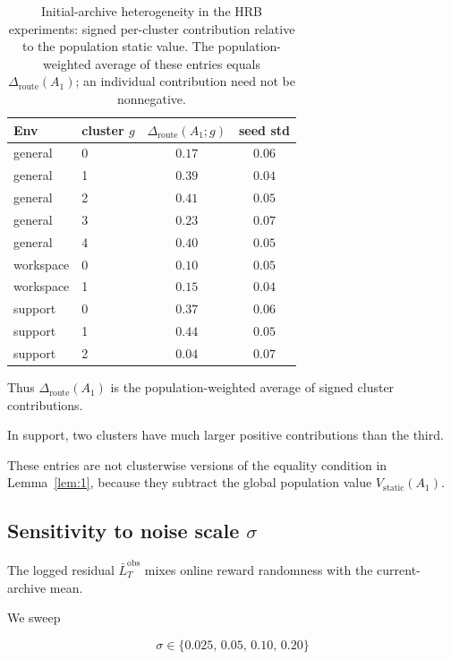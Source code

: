 \documentclass{article} %
\begin{document}
\begin{table}[h]
\centering
\footnotesize
\setlength{\tabcolsep}{4pt}
\begin{tabular}{llcc}
\toprule
Env & cluster $g$ & $\Delta_{\mathrm{route}}(A_1;g)$ & seed std \\
\midrule
general    & 0 & $0.17$ & $0.06$ \\
general    & 1 & $0.39$ & $0.04$ \\
general    & 2 & $0.41$ & $0.05$ \\
general    & 3 & $0.23$ & $0.07$ \\
general    & 4 & $0.40$ & $0.05$ \\
\midrule
workspace  & 0 & $0.10$ & $0.05$ \\
workspace  & 1 & $0.15$ & $0.04$ \\
\midrule
support    & 0 & $0.37$ & $0.06$ \\
support    & 1 & $0.44$ & $0.05$ \\
support    & 2 & $0.04$ & $0.07$ \\
\bottomrule
\end{tabular}
\caption{Initial-archive heterogeneity in the HRB experiments: signed
per-cluster contribution relative to the population static value.
The population-weighted average of these entries equals
\(\Delta_{\mathrm{route}}(A_1)\); an individual contribution need not be
nonnegative.}
\label{tab:app-per-cluster}
\end{table}

Thus \(\Delta_{\mathrm{route}}(A_1)\) is the population-weighted average of
signed cluster contributions.

In support, two clusters have much larger positive contributions than the
third.

These entries are not clusterwise versions of the equality condition in
Lemma~\ref{lem:1}, because they subtract the global population value
\(V_{\mathrm{static}}(A_1)\).

\subsection{\texorpdfstring{Sensitivity to noise scale $\sigma$}{Sensitivity to noise scale sigma}}

\label{app:sigma-sweep}

The logged residual \(\bar L_T^{\mathrm{obs}}\) mixes online reward randomness
with the current-archive mean.

We sweep

\begin{equation}
\label{eq:app-sigma-grid}
\sigma \in \{0.025,\, 0.05,\, 0.10,\, 0.20\}
\end{equation}
\end{document}
